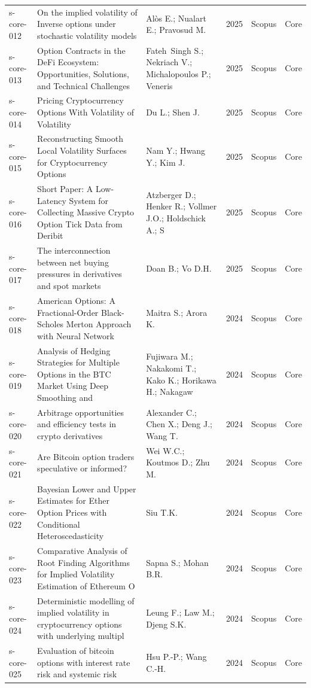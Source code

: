 \documentclass[11pt,a4paper]{article}
\begin{document}
\begin{longtable}{p{}p{}p{}p{}p{}p{}}
s-core-012 & On the implied volatility of Inverse options under stochastic volatility models & Alòs E.; Nualart E.; Pravosud M. & 2025 & Scopus & Core \\
s-core-013 & Option Contracts in the DeFi Ecosystem: Opportunities, Solutions, and Technical Challenges & Fateh Singh S.; Nekriach V.; Michalopoulos P.; Veneris  & 2025 & Scopus & Core \\
s-core-014 & Pricing Cryptocurrency Options With Volatility of Volatility & Du L.; Shen J. & 2025 & Scopus & Core \\
s-core-015 & Reconstructing Smooth Local Volatility Surfaces for Cryptocurrency Options & Nam Y.; Hwang Y.; Kim J. & 2025 & Scopus & Core \\
s-core-016 & Short Paper: A Low-Latency System for Collecting Massive Crypto Option Tick Data from Deribit & Atzberger D.; Henker R.; Vollmer J.O.; Holdschick A.; S & 2025 & Scopus & Core \\
s-core-017 & The interconnection between net buying pressures in derivatives and spot markets & Doan B.; Vo D.H. & 2025 & Scopus & Core \\
s-core-018 & American Options: A Fractional-Order Black-Scholes Merton Approach with Neural Network & Maitra S.; Arora K. & 2024 & Scopus & Core \\
s-core-019 & Analysis of Hedging Strategies for Multiple Options in the BTC Market Using Deep Smoothing and  & Fujiwara M.; Nakakomi T.; Kako K.; Horikawa H.; Nakagaw & 2024 & Scopus & Core \\
s-core-020 & Arbitrage opportunities and efficiency tests in crypto derivatives & Alexander C.; Chen X.; Deng J.; Wang T. & 2024 & Scopus & Core \\
s-core-021 & Are Bitcoin option traders speculative or informed? & Wei W.C.; Koutmos D.; Zhu M. & 2024 & Scopus & Core \\
s-core-022 & Bayesian Lower and Upper Estimates for Ether Option Prices with Conditional Heteroscedasticity  & Siu T.K. & 2024 & Scopus & Core \\
s-core-023 & Comparative Analysis of Root Finding Algorithms for Implied Volatility Estimation of Ethereum O & Sapna S.; Mohan B.R. & 2024 & Scopus & Core \\
s-core-024 & Deterministic modelling of implied volatility in cryptocurrency options with underlying multipl & Leung F.; Law M.; Djeng S.K. & 2024 & Scopus & Core \\
s-core-025 & Evaluation of bitcoin options with interest rate risk and systemic risk & Hsu P.-P.; Wang C.-H. & 2024 & Scopus & Core \\

\end{longtable}
\end{document}
